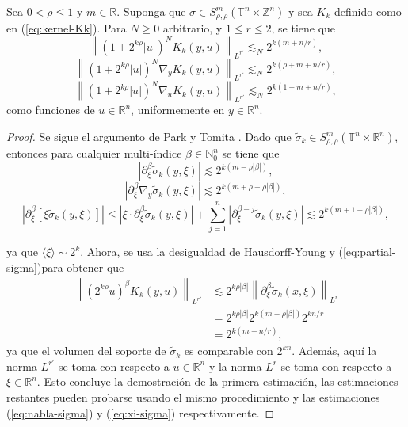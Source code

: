 \begin{lemma}
	Sea $0 < \rho \leq 1$ y $m\in \mathbb{R}$. Suponga que $\sigma \in S^m_{\rho,\rho}(\mathbb{T}^n \times \mathbb{Z}^n) $ y sea $K_k$ definido como en (\ref{eq:kernel-Kk}). Para $N\geq 0$ arbitrario, y $1\leq r\leq 2$, se tiene que 
	\begin{equation*}
		\left\| (1+2^{k\rho}|u|)^N K_k(y, u)
		\right\|_{L^{r'}} \lesssim_N 2^{k(m+n/r)},
	\end{equation*}
	\begin{equation*}
		\left\| (1+2^{k\rho}|u|)^N \nabla_y K_k(y, u)
		\right\|_{L^{r'}} \lesssim_N 2^{k(\rho+m+n/r)},
	\end{equation*}
	\begin{equation*}
		\left\| (1+2^{k\rho}|u|)^N \nabla_u K_k(y, u)
		\right\|_{L^{r'}} \lesssim_N 2^{k(1+m+n/r)},
	\end{equation*}
	como funciones de $u\in\mathbb{R}^n$, uniformemente en $y\in\mathbb{R}^n$.
	\label{lem:kernel-estimates}
\end{lemma}
\begin{proof}
	Se sigue el argumento de Park y Tomita \cite{park-tomita}. Dado que $\tilde{\sigma}_k \in S^m_{\rho,\rho}(\mathbb{T}^n \times \mathbb{R}^n) $, entonces para cualquier multi-índice $\beta\in \mathbb{N}_0^n$ se tiene que
	\begin{equation}
		\left|\partial_\xi^\beta \tilde{\sigma}_k(y, \xi)\right| \lesssim 2^{k(m-\rho|\beta|)},
		\label{eq:partial-sigma}
	\end{equation}
	\begin{equation}
		\left|\partial_\xi^\beta \nabla_y \tilde{\sigma}_k(y, \xi)\right| \lesssim 2^{k(m+\rho-\rho|\beta|)},
		\label{eq:nabla-sigma}
	\end{equation}
	\begin{equation}
		\left|\partial_\xi^\beta [\xi  \tilde{\sigma}_k(y, \xi)]\right| \leq 
		\left|\xi\cdot\partial_\xi^\beta \tilde{\sigma}_k(y,\xi)\right| + \sum_{j=1}^n \left| \partial_\xi^{\beta-j} \tilde{\sigma}_k(y,\xi) \right|
		\lesssim
		2^{k(m+1-\rho|\beta|)},
		\label{eq:xi-sigma}
	\end{equation}
	
	ya que $\langle\xi\rangle \sim 2^k$. Ahora, se usa la desigualdad de Hausdorff-Young y (\ref{eq:partial-sigma})para obtener que
	\begin{align*}
		\left\| (2^{k\rho}u)^\beta K_k(y, u)
		\right\|_{L^{r'}} & \lesssim2^{k\rho|\beta|} \left\| 
		\partial_\xi^\beta \tilde{\sigma}_k(x, \xi)
		\right\|_{L^{r}} \\
		& = 2^{k\rho|\beta|} 2^{k(m-\rho|\beta|)} 2^{kn/r} \\
		& =  2^{k(m+n/r)},
	\end{align*}
	ya que el volumen del soporte de $\tilde{\sigma}_k$ es comparable con $2^{kn}$. Además, aquí la norma $L^{r'}$ se toma con respecto a $u \in \mathbb{R}^n$ y la norma $L^{r}$ se toma con respecto a $\xi\in\mathbb{R}^n$. Esto concluye la demostración de la primera estimación, las estimaciones restantes pueden probarse usando el mismo procedimiento y las estimaciones (\ref{eq:nabla-sigma}) y (\ref{eq:xi-sigma}) respectivamente.
\end{proof}
